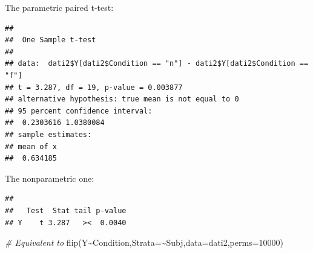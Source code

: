 \documentclass[
]{article}
\newenvironment{Shaded}{\begin{snugshade}}{\end{snugshade}}
\newcommand{\AttributeTok}[1]{\textcolor[rgb]{0.77,0.63,0.00}{#1}}
\newcommand{\CommentTok}[1]{\textcolor[rgb]{0.56,0.35,0.01}{\textit{#1}}}
\newcommand{\DecValTok}[1]{\textcolor[rgb]{0.00,0.00,0.81}{#1}}
\newcommand{\FunctionTok}[1]{\textcolor[rgb]{0.00,0.00,0.00}{#1}}
\newcommand{\NormalTok}[1]{#1}
\newcommand{\SpecialCharTok}[1]{\textcolor[rgb]{0.00,0.00,0.00}{#1}}
\newcommand{\StringTok}[1]{\textcolor[rgb]{0.31,0.60,0.02}{#1}}
\begin{document}
The parametric paired t-test:

\begin{Shaded}
\end{Shaded}

\begin{verbatim}
## 
##  One Sample t-test
## 
## data:  dati2$Y[dati2$Condition == "n"] - dati2$Y[dati2$Condition == "f"]
## t = 3.287, df = 19, p-value = 0.003877
## alternative hypothesis: true mean is not equal to 0
## 95 percent confidence interval:
##  0.2303616 1.0380084
## sample estimates:
## mean of x 
##  0.634185
\end{verbatim}

The nonparametric one:

\begin{Shaded}
\end{Shaded}

\begin{verbatim}
## 
##   Test  Stat tail p-value
## Y    t 3.287   ><  0.0040
\end{verbatim}

\begin{Shaded}
\begin{Highlighting}[]
\CommentTok{\# Equivalent to}
\FunctionTok{flip}\NormalTok{(Y}\SpecialCharTok{\textasciitilde{}}\NormalTok{Condition,}\AttributeTok{Strata=}\SpecialCharTok{\textasciitilde{}}\NormalTok{Subj,}\AttributeTok{data=}\NormalTok{dati2,}\AttributeTok{perms=}\DecValTok{10000}\NormalTok{)}
\end{Highlighting}
\end{Shaded}
\end{document}
